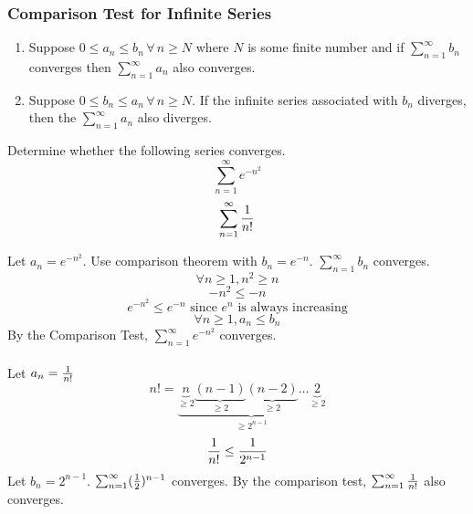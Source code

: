 \documentclass[english, 12pt]{article}
\begin{document}
\subsubsection{Comparison Test for Infinite Series}
\begin{enumerate}
\item Suppose $ 0 \leq a_{n} \leq b_{n}\, \forall\, n \geq N$ where $N$ is some finite number and if $\sum_{n=1}^\infty b_{n}$ converges then $\sum_{n=1}^\infty a_{n}$ also converges.
\item Suppose $ 0 \leq b_{n} \leq a_{n}\,\forall\, n \geq N$. If the infinite series associated with $b_{n}$ diverges, then the $\sum_{n=1}^\infty a_{n}$ also diverges.
\end{enumerate}
\begin{exmp}
Determine whether the following series converges.
\begin{equation}
\sum_{n=1}^\infty e^{-n^2}
\end{equation}
\begin{equation}
\sum_{n=1}^\infty \frac{1}{n!}
\end{equation}
\begin{sol}
Let $a_{n} = e^{-n^2}$. Use comparison theorem with $b_{n} = e^{-n}$. $\sum_{n=1}^\infty b_{n}$ converges. 
\[\forall n \geq 1, n^2 \geq n \]
\[ -n^2 \leq -n \]
\[e^{-n^2} \leq e^{-n} \text{ since $e^n$ is always increasing} \]
\[\forall n \geq 1, a_{n} \leq b_{n} \]
By the Comparison Test, $\sum_{n=1}^\infty e^{-n^2}$ converges.\\\\
Let $a_{n} = \frac{1}{n!}$
\[n! = \underbrace{\underbrace{n}_{\geq 2} \underbrace{(n-1)}_{\geq 2}  \underbrace{(n-2)}_{\geq 2}  \dots \underbrace{2}_{\geq 2}}_{\geq 2^{n-1}}  \]
\[\frac{1}{n!} \leq \frac{1}{2^{n-1}} \]
Let $b_{n} = 2^{n-1}$. $\sum_{n=1}^\infty (\frac{1}{2})^{n-1}$ converges.
By the comparison test, $\sum_{n=1}^\infty \frac{1}{n!}$ also converges.
\end{sol}
\end{exmp}
\end{document}
